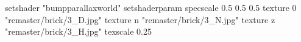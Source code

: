 setshader "bumpparallaxworld"
setshaderparam specscale 0.5 0.5 0.5
    texture 0 "remaster/brick/3_D.jpg"
    texture n "remaster/brick/3_N.jpg"
    texture z "remaster/brick/3_H.jpg"
    texscale 0.25